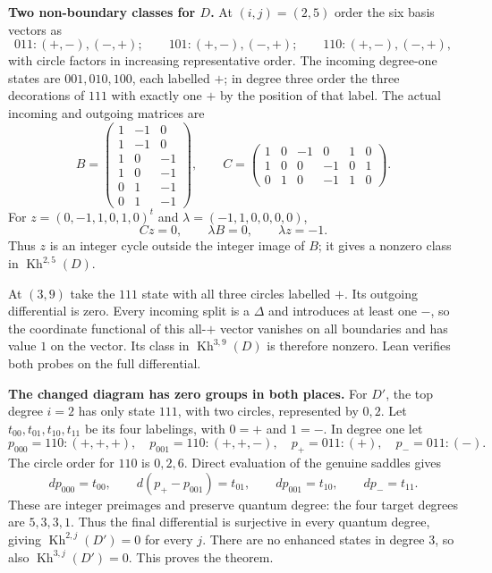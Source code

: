 \documentclass[10pt]{article}
\newcommand{\Kh}{\operatorname{Kh}}
\begin{document}
\newpage
\textbf{Two non-boundary classes for $D$.}
At $(i,j)=(2,5)$ order the six basis vectors as
\[
 011:(+,-),(-,+);\qquad101:(+,-),(-,+);\qquad110:(+,-),(-,+),
\]
with circle factors in increasing representative order. The incoming degree-one
states are $001,010,100$, each labelled $+$; in degree three order the three
decorations of $111$ with exactly one $+$ by the position of that label.
The actual incoming and outgoing matrices are
\[
 B=\begin{pmatrix}
 1&-1&0\\1&-1&0\\1&0&-1\\1&0&-1\\0&1&-1\\0&1&-1
 \end{pmatrix},\qquad
 C=\begin{pmatrix}
 1&0&-1&0&1&0\\1&0&0&-1&0&1\\0&1&0&-1&1&0
 \end{pmatrix}.
\]
For $z=(0,-1,1,0,1,0)^t$ and $\lambda=(-1,1,0,0,0,0)$,
\[
 Cz=0,\qquad \lambda B=0,\qquad \lambda z=-1.
\]
Thus $z$ is an integer cycle outside the integer image of $B$; it gives a
nonzero class in $\Kh^{2,5}(D)$.

At $(3,9)$ take the $111$ state with all three circles labelled $+$. Its
outgoing differential is zero. Every incoming split is a $\Delta$ and introduces
at least one $-$, so the coordinate functional of this all-$+$ vector vanishes
on all boundaries and has value $1$ on the vector. Its class in
$\Kh^{3,9}(D)$ is therefore nonzero. Lean verifies both probes on the full differential.

\textbf{The changed diagram has zero groups in both places.}
For $D'$, the top degree $i=2$ has only state $111$, with two circles, represented
by $0,2$. Let $t_{00},t_{01},t_{10},t_{11}$ be its four labelings, with $0=+$
and $1=-$. In degree one let
\[
 p_{000}=110:(+,+,+),\quad p_{001}=110:(+,+,-),\quad
 p_+=011:(+),\quad p_-=011:(-).
\]
The circle order for $110$ is $0,2,6$. Direct evaluation of the genuine saddles gives
\[
 d p_{000}=t_{00},\qquad d(p_+-p_{001})=t_{01},\qquad
 d p_{001}=t_{10},\qquad d p_-=t_{11}.
\]
These are integer preimages and preserve quantum degree: the four target degrees
are $5,3,3,1$. Thus the final differential is surjective in every quantum degree,
giving $\Kh^{2,j}(D')=0$ for every $j$. There are no enhanced states in degree
$3$, so also $\Kh^{3,j}(D')=0$. This proves the theorem.
\end{document}
